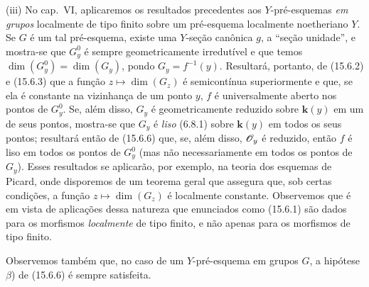 \begin{remarks}[15.6.10]
(iii) No cap.~VI, aplicaremos os resultados precedentes aos $Y$-pré-esquemas \emph{em grupos} localmente de tipo finito sobre um pré-esquema localmente noetheriano $Y$. Se $G$ é um tal pré-esquema, existe uma $Y$-seção canônica $g$, a ``seção unidade'', e mostra-se que $G_y^0$ é sempre geometricamente irredutível e que temos $\dim(G_y^0)=\dim(G_y)$, pondo $G_y=f^{-1}(y)$. Resultará, portanto, de (15.6.2) e (15.6.3) que a função $z\mapsto\dim(G_z)$ é semicontínua superiormente e que, se ela é constante na vizinhança de um ponto $y$, $f$ é universalmente aberto nos pontos de $G_y^0$. Se, além disso, $G_y$ é geometricamente reduzido sobre $\mathbf{k}(y)$ em um de seus pontos, mostra-se que $G_y$ é \emph{liso} (6.8.1) sobre $\mathbf{k}(y)$ em todos os seus pontos; resultará então de (15.6.6) que, se, além disso, $\mathscr{O}_y$ é reduzido, então $f$ é liso em todos os pontos de $G_y^0$ (mas não necessariamente em todos os pontos de $G_y$). Esses resultados se aplicarão, por exemplo, na teoria dos esquemas de Picard, onde disporemos de um teorema geral que assegura que, sob certas condições, a função $z\mapsto\dim(G_z)$ é localmente constante. Observemos que é em vista de aplicações dessa natureza que enunciados como (15.6.1) são dados para os morfismos \emph{localmente} de tipo finito, e não apenas para os morfismos de tipo finito.

Observemos também que, no caso de um $Y$-pré-esquema em grupos $G$, a hipótese $\beta$) de (15.6.6) é sempre satisfeita.
\end{remarks}
